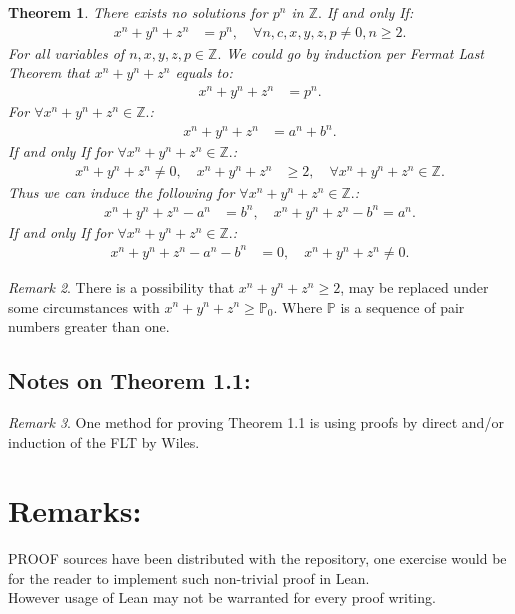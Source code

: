 \documentclass[10pt]{article}
\theoremstyle{plain}
\newtheorem{theorem}{Theorem}[section]
\theoremstyle{definition}
\theoremstyle{remark}
\newtheorem{remark}[theorem]{Remark}
\begin{document}
	\begin{theorem}
		There exists no solutions for $p^{n}$ in $\mathbb{Z}.$ If and only If:
		\begin{align*}
			x^{n} + y^{n} + z^{n} &= p^{n}, \quad \forall n, c, x, y, z, p \neq 0, n \geq 2.
		\end{align*}
		For all variables of $n, x, y, z, p \in \mathbb{Z}.$ We could go by induction per Fermat Last Theorem that $x^{n} + y^{n} + z^{n}$ equals to:	
		\begin{align*}
			x^{n} + y^{n} + z^{n} &= p^{n}.
		\end{align*}
		For $\forall x^{n} + y^{n} + z^{n} \in \mathbb{Z}.$:
		\begin{align*}
			x^{n} + y^{n} + z^{n} &= a^{n} + b^{n}.
		\end{align*}
		If and only If for $\forall x^{n} + y^{n} + z^{n} \in \mathbb{Z}.$:
		\begin{align*}
			x^{n} + y^{n} + z^{n} \neq 0, \quad x^{n} + y^{n} + z^{n} &\geq 2, \quad \forall x^{n} + y^{n} + z^{n} \in \mathbb{Z}.
		\end{align*}
		Thus we can induce the following for $\forall x^{n} + y^{n} + z^{n} \in \mathbb{Z}.$:
		\begin{align*}
			x^{n} + y^{n} + z^{n} -  a^{n} &= b^{n}, \quad x^{n} + y^{n} + z^{n} - b^{n} = a^{n}.
		\end{align*}
		If and only If for $\forall x^{n} + y^{n} + z^{n} \in \mathbb{Z}.$:
		\begin{align*}
			x^{n} + y^{n} + z^{n} -  a^{n} - b^{n} &= 0, \quad x^{n} + y^{n} + z^{n} \neq 0.
		\end{align*}
	\end{theorem}
	\begin{remark}
		There is a possibility that $x^{n} + y^{n} + z^{n} \geq 2$, may be replaced under some circumstances with $x^{n} + y^{n} + z^{n} \geq \mathbb{P}_{0}.$ Where $\mathbb{P}$ is a sequence of pair numbers greater than one.
	\end{remark}
	\subsection{Notes on Theorem 1.1:}
	\begin{remark}
		One method for proving Theorem 1.1 is using proofs by direct and/or induction of the FLT by Wiles.
	\end{remark}
	\section{Remarks:}
	\lettrine[lines=1, lhang=0.1, loversize=0.2]{P}ROOF sources have been distributed with the repository, one exercise would be for the reader to implement such non-trivial proof in Lean.\\However usage of Lean may not be warranted for every proof writing.
\end{document}
